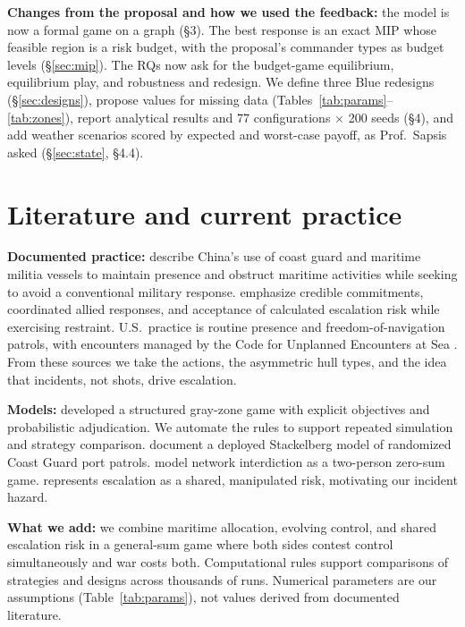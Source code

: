 \documentclass[10pt]{article}
\newcommand{\1}{\mathbf{1}}
\begin{document}
\textbf{Changes from the proposal and how we used the feedback:} the model is now a formal game on a graph (\S3).
The best response is an exact MIP whose feasible region is a risk budget, with the proposal's commander types as
budget levels (\S\ref{sec:mip}). The RQs now ask for the budget-game equilibrium, equilibrium play, and robustness
and redesign. We define three Blue redesigns (\S\ref{sec:designs}), propose values for missing data
(Tables~\ref{tab:params}--\ref{tab:zones}), report analytical results and 77 configurations $\times$ 200 seeds
(\S4), and add weather scenarios scored by expected and worst-case payoff, as Prof.\ Sapsis asked (\S\ref{sec:state},
\S4.4).

\section{Literature and current practice}
\textbf{Documented practice:} 
\citet{helmus2024} describe China's use of coast guard and maritime militia vessels to 
maintain presence and obstruct maritime activities while seeking to avoid a conventional military response. 
\citet{green2017} emphasize credible commitments, coordinated allied responses, and acceptance of calculated escalation risk while exercising restraint.
U.S.\ practice is routine presence and freedom-of-navigation patrols, with encounters managed
by the Code for Unplanned Encounters at Sea \citep{cues2014}. From these sources we take the actions,
the asymmetric hull types, and the idea that incidents, not shots, drive escalation.

\textbf{Models:} 
\citet{wasser2019} developed a structured gray-zone game with explicit objectives and probabilistic adjudication. We automate the rules to support repeated simulation and strategy comparison. \citet{shieh2012} document a deployed Stackelberg model of randomized Coast Guard port patrols. 
\citet{washburn1995} model network interdiction as a two-person zero-sum game. \citet{schelling1966} represents escalation as a shared,
manipulated risk, motivating our incident hazard.

\textbf{What we add:} we combine maritime allocation, evolving control, and shared escalation risk in a general-sum game where both sides contest control simultaneously and war costs both. Computational rules support comparisons of strategies and designs across thousands of runs. Numerical parameters are our
assumptions (Table~\ref{tab:params}), not values derived from documented literature.
\end{document}
